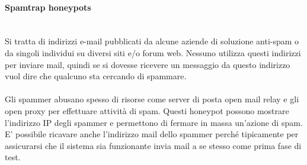 \documentclass[8pt]{extarticle}
\begin{document}
\paragraph{Spamtrap honeypots}
\noindent
\\
Si tratta di indirizzi e-mail pubblicati da alcune aziende di soluzione anti-spam o da singoli individui su diversi 
siti e/o forum web. Nessuno utilizza questi indirizzi per inviare mail, quindi se si dovesse ricevere un messaggio 
da questo indirizzo vuol dire che qualcuno sta cercando di spammare.\\\\
Gli spammer abusano spesso di risorse come server di posta open mail relay e gli open proxy per effettuare attività di spam.
Questi honeypot possono mostrare l’indirizzo IP degli spammer e permettono di fermare in massa un’azione di spam. 
E’ possibile ricavare anche l’indirizzo mail dello spammer perché tipicamente per assicurarsi che il sistema sia funzionante 
invia mail a se stesso come prima fase di test.
\end{document}
